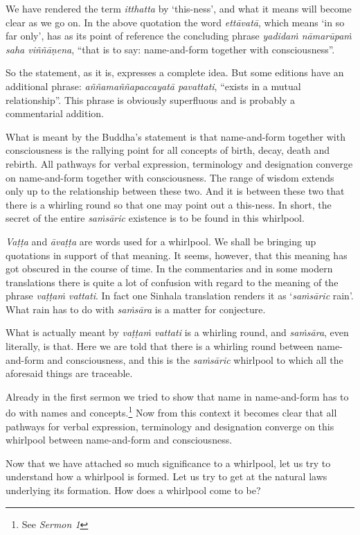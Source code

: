 We have rendered the term \emph{itthatta} by `this-ness', and what it means will become clear as we go on. In the above quotation the word \emph{ettāvatā}, which means `in so far only', has as its point of reference the concluding phrase \emph{yadidaṁ nāmarūpaṁ saha viññāṇena}, ``that is to say: name-and-form together with consciousness''.

So the statement, as it is, expresses a complete idea. But some editions have an additional phrase: \emph{aññamaññapaccayatā pavattati}, ``exists in a mutual relationship''. This phrase is obviously superfluous and is probably a commentarial addition.

What is meant by the Buddha's statement is that name-and-form together with consciousness is the rallying point for all concepts of birth, decay, death and rebirth. All pathways for verbal expression, terminology and designation converge on name-and-form together with consciousness. The range of wisdom extends only up to the relationship between these two. And it is between these two that there is a whirling round so that one may point out a this-ness. In short, the secret of the entire \emph{saṁsāric} existence is to be found in this whirlpool.

\emph{Vaṭṭa} and \emph{āvaṭṭa} are words used for a whirlpool. We shall be bringing up quotations in support of that meaning. It seems, however, that this meaning has got obscured in the course of time. In the commentaries and in some modern translations there is quite a lot of confusion with regard to the meaning of the phrase \emph{vaṭṭaṁ vattati}. In fact one Sinhala translation renders it as `\emph{saṁsāric} rain'. What rain has to do with \emph{saṁsāra} is a matter for conjecture.

What is actually meant by \emph{vaṭṭaṁ vattati} is a whirling round, and \emph{saṁsāra}, even literally, is that. Here we are told that there is a whirling round between name-and-form and consciousness, and this is the \emph{saṁsāric} whirlpool to which all the aforesaid things are traceable.

Already in the first sermon we tried to show that name in name-and-form has to do with names and concepts.\footnote{See \emph{Sermon 1}} Now from this context it becomes clear that all pathways for verbal expression, terminology and designation converge on this whirlpool between name-and-form and consciousness.

Now that we have attached so much significance to a whirlpool, let us try to understand how a whirlpool is formed. Let us try to get at the natural laws underlying its formation. How does a whirlpool come to be?


